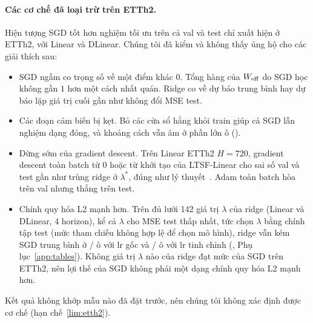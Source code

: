 \begin{captionbelowboxaivn}
\label{tab:b4}
\end{captionbelowboxaivn}
\begin{center}
\small

\end{center}

\paragraph{Các cơ chế đã loại trừ trên ETTh2.} Hiện tượng SGD tốt hơn nghiệm tối ưu trên cả val và test chỉ xuất hiện ở ETTh2, với Linear và DLinear. Chúng tôi đã kiểm và không thấy ủng hộ cho các giải thích sau:
\begin{itemize}
    \item SGD ngầm co trọng số về một điểm khác $0$. Tổng hàng của $W_{\mathrm{eff}}$ do SGD học không gần $1$ hơn một cách nhất quán. Ridge co về dự báo trung bình hay dự báo lặp giá trị cuối gần như không đổi MSE test.
    \item Các đoạn cảm biến bị kẹt. Bỏ các cửa sổ hằng khỏi train giúp cả SGD lẫn nghiệm dạng đóng, và khoảng cách vẫn âm ở phần lớn ô ().
    \item Dừng sớm của gradient descent. Trên Linear ETTh2 $H = 720$, gradient descent toàn batch từ $0$ hoặc từ khởi tạo của LTSF-Linear cho sai số val và test gần như trùng ridge ở $\lambda^*$, đúng như lý thuyết~\cite{ali2019continuous}. Adam toàn batch hòa trên val nhưng thắng trên test.
    \item Chính quy hóa L2 mạnh hơn. Trên đủ lưới 142 giá trị $\lambda$ của ridge (Linear và DLinear, 4 horizon), kể cả $\lambda$ cho MSE test thấp nhất, tức chọn $\lambda$ bằng chính tập test (mức tham chiếu không hợp lệ để chọn mô hình), ridge vẫn kém SGD trung bình ở \nmRidgeBestWorseOrigCount/\nmRidgeCellCount{} ô với lr gốc và \nmRidgeBestWorseTunedCount/\nmRidgeCellCount{} ô với lr tinh chỉnh (, Phụ lục~\ref{app:tables}). Không giá trị $\lambda$ nào của ridge đạt mức của SGD trên ETTh2, nên lợi thế của SGD không phải một dạng chính quy hóa L2 mạnh hơn.
\end{itemize}
Kết quả không khớp mẫu nào đã đặt trước, nên chúng tôi không xác định được cơ chế (hạn chế~\ref{lim:etth2}).

